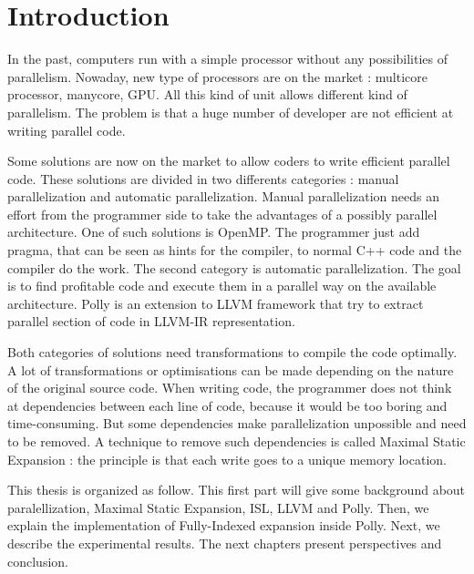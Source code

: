 \chapter*{Introduction}\label{ch:Intro}

In the past, computers run with a simple processor without any possibilities of parallelism. Nowaday, new type of processors are on the market : multicore processor, manycore, GPU. All this kind of unit allows different kind of parallelism. The problem is that a huge number of developer are not efficient at writing parallel code. 

Some solutions are now on the market to allow coders to write efficient parallel code. These solutions are divided in two differents categories : manual parallelization and automatic parallelization. Manual parallelization needs an effort from the programmer side to take the advantages of a possibly parallel architecture. One of such solutions is OpenMP. The programmer just add pragma, that can be seen as hints for the compiler, to normal C++ code and the compiler do the work. The second category is automatic parallelization. The goal is to find profitable code and execute them in a parallel way on the available architecture. Polly is an extension to LLVM framework that try to extract parallel section of code in LLVM-IR representation.

Both categories of solutions need transformations to compile the code optimally. A lot of transformations or optimisations can be made depending on the nature of the original source code. When writing code, the programmer does not think at dependencies between each line of code, because it would be too boring and time-consuming. But some dependencies make parallelization unpossible and need to be removed. A technique to remove such dependencies is called Maximal Static Expansion : the principle is that each write goes to a unique memory location.

This thesis is organized as follow. This first part will give some background about paralellization, Maximal Static Expansion, ISL, LLVM and Polly. Then, we explain the implementation of Fully-Indexed expansion inside Polly. Next, we describe the experimental results. The next chapters present perspectives and conclusion.

